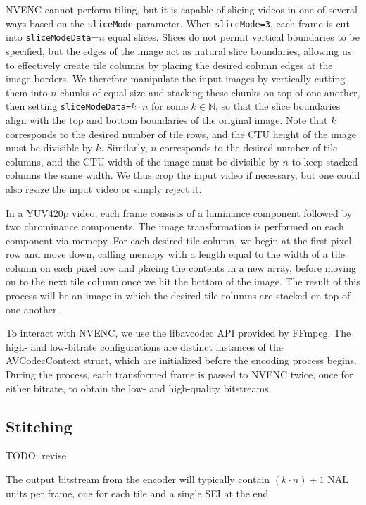 NVENC cannot perform tiling, but it is capable of slicing videos in one of several ways based on the \texttt{sliceMode} parameter. When \texttt{sliceMode=3}, each frame is cut into \texttt{sliceModeData}=$n$ equal slices. Slices do not permit vertical boundaries to be specified, but the edges of the image act as natural slice boundaries, allowing us to effectively create tile columns by placing the desired column edges at the image borders. We therefore manipulate the input images by vertically cutting them into $n$ chunks of equal size and stacking these chunks on top of one another, then setting \texttt{sliceModeData=}$k \cdot n$ for some $k \in \mathbb{N}$, so that the slice boundaries align with the top and bottom boundaries of the original image. Note that $k$ corresponds to the desired number of tile rows, and the CTU height of the image must be divisible by $k$. Similarly, $n$ corresponds to the desired number of tile columns, and the CTU width of the image must be divisible by $n$ to keep stacked columns the same width. We thus crop the input video if necessary, but one could also resize the input video or simply reject it. 

In a YUV420p video, each frame consists of a luminance component followed by two chrominance components. The image transformation is performed on each component via memcpy. For each desired tile column, we begin at the first pixel row and move down, calling memcpy with a length equal to the width of a tile column on each pixel row and placing the contents in a new array, before moving on to the next tile column once we hit the bottom of the image. The result of this process will be an image in which the desired tile columns are stacked on top of one another.

To interact with NVENC, we use the libavcodec API provided by FFmpeg. The high- and low-bitrate configurations are distinct instances of the AVCodecContext struct, which are initialized before the encoding process begins. During the process, each transformed frame is passed to NVENC twice, once for either bitrate, to obtain the low- and high-quality bitstreams.

\subsection{Stitching}

TODO: revise

The output bitstream from the encoder will typically contain $(k \cdot n)+1$ NAL units per frame, one for each tile and a single SEI at the end.

